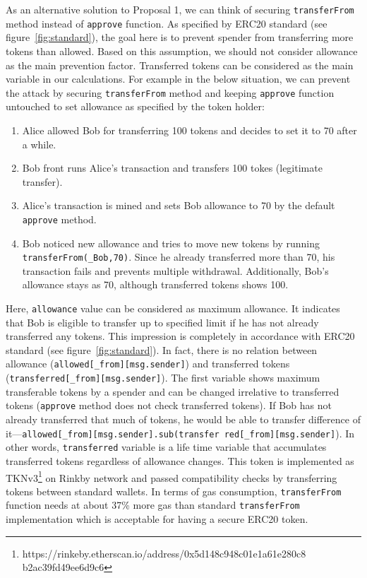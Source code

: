 As an alternative solution to Proposal 1, we can think of securing \texttt{transferFrom} method instead of \texttt{approve} function. As specified by ERC20 standard (see figure~\ref{fig:standard}), the goal here is to prevent spender from transferring more tokens than allowed. Based on this assumption, we should not consider allowance as the main prevention factor. Transferred tokens can be considered as the main variable in our calculations. For example in the below situation, we can prevent the attack by securing \texttt{transferFrom} method and keeping \texttt{approve} function untouched to set allowance as specified by the token holder:
\begin{enumerate}
	\item Alice allowed Bob for transferring 100 tokens and decides to set it to 70 after a while.
	\item Bob front runs Alice’s transaction and transfers 100 tokes (legitimate transfer).
	\item Alice’s transaction is mined and sets Bob allowance to 70 by the default \texttt{approve} method.
	\item Bob noticed new allowance and tries to move new tokens by running \texttt{transferFrom(\_Bob,70)}. Since he already transferred more than 70, his transaction fails and prevents multiple withdrawal. Additionally, Bob’s allowance stays as 70, although transferred tokens shows 100.
\end{enumerate}
Here, \texttt{allowance} value can be considered as maximum allowance. It indicates that Bob is eligible to transfer up to specified limit if he has not already transferred any tokens. This impression is completely in accordance with ERC20 standard (see figure~\ref{fig:standard}). In fact, there is no relation between allowance (\texttt{allowed[\_from][msg.sender]}) and transferred tokens (\texttt{transferred[\_from][msg.sender]}). The first variable shows maximum transferable tokens by a spender and can be changed irrelative to transferred tokens (\ie \texttt{approve} method does not check transferred tokens). If Bob has not already transferred that much of tokens, he would be able to transfer difference of it---\texttt{allowed[\_from][msg.sender].sub(transfer red[\_from][msg.sender]}). In other words, \texttt{transferred} variable is a life time variable that accumulates transferred tokens regardless of allowance changes. This token is implemented as TKNv3\footnote{https://rinkeby.etherscan.io/address/0x5d148c948c01e1a61e280c8 b2ac39fd49ee6d9c6} on Rinkby network and passed compatibility checks by transferring tokens between standard wallets. In terms of gas consumption, \texttt{transferFrom} function needs at about 37\% more gas than standard \texttt{transferFrom} implementation which is acceptable for having a secure ERC20 token.

